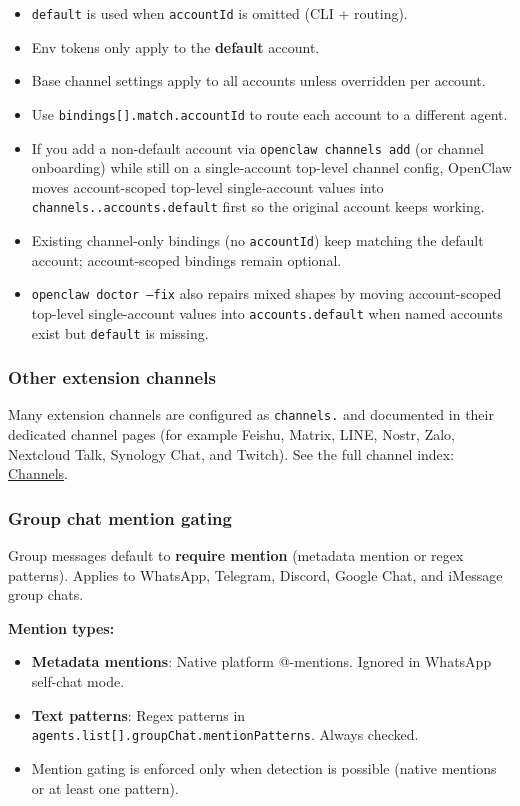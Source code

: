 \begin{itemize}
  \item \texttt{default} is used when \texttt{accountId} is omitted (CLI + routing).
  \item Env tokens only apply to the \textbf{default} account.
  \item Base channel settings apply to all accounts unless overridden per account.
  \item Use \texttt{bindings[].match.accountId} to route each account to a different agent.
  \item If you add a non-default account via \texttt{openclaw channels add} (or channel onboarding) while still on a single-account top-level channel config, OpenClaw moves account-scoped top-level single-account values into \texttt{channels..accounts.default} first so the original account keeps working.
  \item Existing channel-only bindings (no \texttt{accountId}) keep matching the default account; account-scoped bindings remain optional.
  \item \texttt{openclaw doctor --fix} also repairs mixed shapes by moving account-scoped top-level single-account values into \texttt{accounts.default} when named accounts exist but \texttt{default} is missing.
\end{itemize}


\subsubsection{Other extension channels}


Many extension channels are configured as \texttt{channels.} and documented in their dedicated channel pages (for example Feishu, Matrix, LINE, Nostr, Zalo, Nextcloud Talk, Synology Chat, and Twitch).
See the full channel index: \href{/channels}{Channels}.

\subsubsection{Group chat mention gating}


Group messages default to \textbf{require mention} (metadata mention or regex patterns). Applies to WhatsApp, Telegram, Discord, Google Chat, and iMessage group chats.

\textbf{Mention types:}

\begin{itemize}
  \item \textbf{Metadata mentions}: Native platform @-mentions. Ignored in WhatsApp self-chat mode.
  \item \textbf{Text patterns}: Regex patterns in \texttt{agents.list[].groupChat.mentionPatterns}. Always checked.
  \item Mention gating is enforced only when detection is possible (native mentions or at least one pattern).
\end{itemize}



